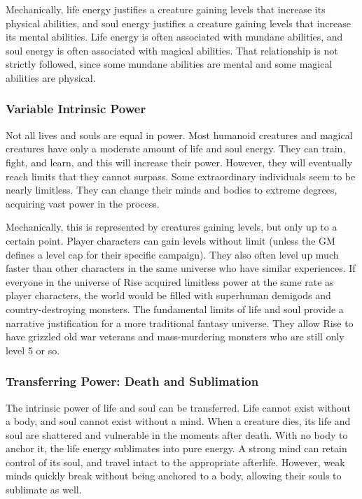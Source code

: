     Mechanically, life energy justifies a creature gaining levels that increase its physical abilities, and soul energy justifies a creature gaining levels that increase its mental abilities.
    Life energy is often associated with mundane abilities, and soul energy is often associated with magical abilities.
    That relationship is not strictly followed, since some mundane abilities are mental and some magical abilities are physical.

    \subsubsection{Variable Intrinsic Power}
      Not all lives and souls are equal in power.
      Most humanoid creatures and magical creatures have only a moderate amount of life and soul energy.
      They can train, fight, and learn, and this will increase their power.
      However, they will eventually reach limits that they cannot surpass.
      Some extraordinary individuals seem to be nearly limitless.
      They can change their minds and bodies to extreme degrees, acquiring vast power in the process.

      Mechanically, this is represented by creatures gaining levels, but only up to a certain point.
      Player characters can gain levels without limit (unless the GM defines a level cap for their specific campaign).
      They also often level up much faster than other characters in the same universe who have similar experiences.
      If everyone in the universe of Rise acquired limitless power at the same rate as player characters, the world would be filled with superhuman demigods and country-destroying monsters.
      The fundamental limits of life and soul provide a narrative justification for a more traditional fantasy universe.
      They allow Rise to have grizzled old war veterans and mass-murdering monsters who are still only level 5 or so.

    \subsubsection{Transferring Power: Death and Sublimation}
      The intrinsic power of life and soul can be transferred.
      Life cannot exist without a body, and soul cannot exist without a mind.
      When a creature dies, its life and soul are shattered and vulnerable in the moments after death.
      With no body to anchor it, the life energy sublimates into pure energy.
      A strong mind can retain control of its soul, and travel intact to the appropriate afterlife.
      However, weak minds quickly break without being anchored to a body, allowing their souls to sublimate as well.

